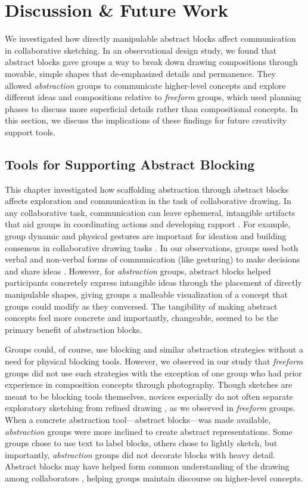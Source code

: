\section{Discussion \& Future Work}
We investigated how directly manipulable abstract blocks affect communication in collaborative sketching. In an observational design study, we found that abstract blocks gave groups a way to break down drawing compositions through movable, simple shapes that de-emphasized details and permanence. They allowed \textit{abstraction} groups to communicate higher-level concepts and explore different ideas and compositions relative to \textit{freeform} groups, which used planning phases to discuss more superficial details rather than compositional concepts. In this section, we discuss the implications of these findings for future creativity support tools.

\subsection{Tools for Supporting Abstract Blocking}
This chapter investigated how scaffolding abstraction through abstract blocks affects exploration and communication in the task of collaborative drawing. 
In any collaborative task, communication can leave ephemeral, intangible artifacts that aid groups in coordinating actions and developing rapport \cite{Davis2017,Davis2016}. For example, group dynamic and physical gestures are important for ideation and building consensus in collaborative drawing tasks \cite{Bly1988, Tang1991}. In our observations, groups used both verbal and non-verbal forms of communication (like gesturing) to make decisions and share ideas \cite{goldin1999}. However, for \textit{abstraction} groups, abstract blocks helped participants concretely express intangible ideas through the placement of directly manipulable shapes, giving groups a malleable visualization of a concept that groups could modify as they conversed. The tangibility of making abstract concepts feel more concrete and importantly, changeable, seemed to be the primary benefit of abstraction blocks.

Groups could, of course, use blocking and similar abstraction strategies without a need for physical blocking tools. However, we observed in our study that \textit{freeform} groups did not use such strategies with the exception of one group who had prior experience in composition concepts through photography. Though sketches are meant to be blocking tools themselves, novices especially do not often separate exploratory sketching from refined drawing \cite{welch2000sketching}, as we observed in \textit{freeform} groups. When a concrete abstraction tool---abstract blocks---was made available, \textit{abstraction} groups were more inclined to create abstract representations. Some groups chose to use text to label blocks, others chose to lightly sketch, but importantly, \textit{abstraction} groups did not decorate blocks with heavy detail. Abstract blocks may have helped form common understanding of the drawing among collaborators \cite{olson2000distance}, helping groups maintain discourse on higher-level concepts.

